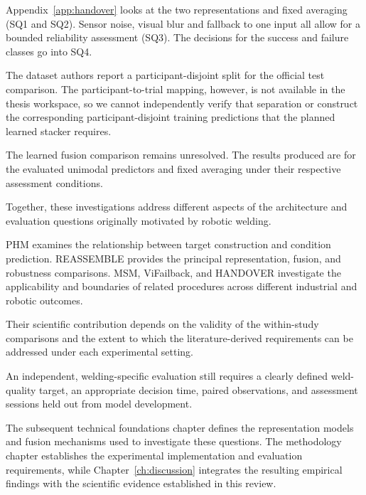 Appendix~\ref{app:handover} looks at the two representations and fixed averaging (SQ1 and SQ2).
Sensor noise, visual blur and fallback to one input all allow for a bounded reliability assessment
(SQ3). The decisions for the success and failure classes go into SQ4.

The dataset authors report a participant-disjoint split for the official test comparison. The
participant-to-trial mapping, however, is not available in the thesis workspace, so we cannot
independently verify that separation or construct the corresponding participant-disjoint training
predictions that the planned learned stacker requires.

The learned fusion comparison remains unresolved. The results produced are for the evaluated
unimodal predictors and fixed averaging under their respective assessment conditions.

Together, these investigations address different aspects of the architecture and evaluation
questions originally motivated by robotic welding.

PHM examines the relationship between target construction and condition prediction. REASSEMBLE
provides the principal representation, fusion, and robustness comparisons. MSM, ViFailback, and
HANDOVER investigate the applicability and boundaries of related procedures across different
industrial and robotic outcomes.

Their scientific contribution depends on the validity of the within-study comparisons and the extent
to which the literature-derived requirements can be addressed under each experimental setting.

An independent, welding-specific evaluation still requires a clearly defined weld-quality target, an
appropriate decision time, paired observations, and assessment sessions held out from model
development.

The subsequent technical foundations chapter defines the representation models and fusion mechanisms
used to investigate these questions. The methodology chapter establishes the experimental
implementation and evaluation requirements, while Chapter~\ref{ch:discussion} integrates the
resulting empirical findings with the scientific evidence established in this review.
